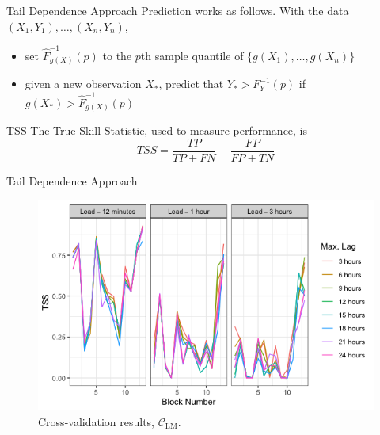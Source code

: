 \documentclass{beamer}
\begin{document}
\begin{frame}{Tail Dependence Approach}
    Prediction works as follows. With the data $(X_1, Y_1), \ldots, (X_n, Y_n)$,
    \begin{itemize}
        \item set $\hat{F}_{g(X)}^{-1}(p)$ to the $p$th sample quantile of $\{g(X_1), \ldots, g(X_n)\}$
        \item given a new observation $X_*$, predict that $Y_* > F_{Y}^{-1}(p)$ if $g(X_*) > \hat{F}_{g(X)}^{-1}(p)$
    \end{itemize}
\end{frame}

\begin{frame}{TSS}
    The True Skill Statistic, used to measure performance, is
    \[
    TSS = \frac{TP}{TP + FN} - \frac{FP}{FP + TN}
    \]
\end{frame}

\begin{frame}{Tail Dependence Approach}
    \begin{figure}
        \centering
        \includegraphics[scale=0.5]{group02_cv_study01_tss.png}
        \caption{Cross-validation results, $\mathcal{C}_{\text{LM}}$.}
        \label{fig:group05_cv_study01_tss}
    \end{figure}
\end{frame}
\end{document}
